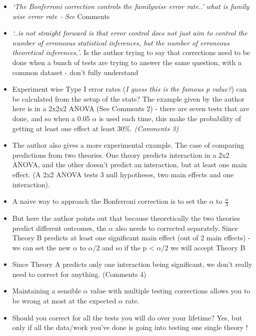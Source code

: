 \documentclass[
]{book}
\begin{document}
\begin{itemize}
\item
  \emph{`The Bonferroni correction controls the familywise error rate..'} \protect\hypertarget{lakens_com}{}{\emph{what is family wise error rate - See} Comments}
\item
  \emph{`..is not straight forward is that error control does not just aim to control the number of erroneous statistical inferences, but the number of erroneous theoretical inferences.'}. Is the author trying to say that corrections need to be done when a bunch of tests are trying to answer the same question, with a common dataset - don't fully understand
\item
  Experiment wise Type I error rates (\emph{I guess this is the famous p value?}) can be calculated from the setup of the stats? The example given by the author here is in a 2x2x2 ANOVA (See \protect\hypertarget{lakens_com}{}{Comments 2}) - there are seven tests that are done, and so when a 0.05 \(\alpha\) is used each time, this make the probability of getting at least one effect at least 30\%. \emph{(\protect\hypertarget{lakens_com}{}{Comments 3})}
\item
  The author also gives a more experimental example. The case of comparing predictions from two theories. One theory predicts interaction in a 2x2 ANOVA, and the other doesn't predict an interaction, but at least one main effect. (A 2x2 ANOVA tests 3 null hypotheses, two main effects and one interaction).\\
\item
  A naive way to approach the Bonferroni correction is to set the \(\alpha\) to \(\frac{\alpha}{3}\)
\item
  But here the author points out that because theoretically the two theories predict different outcomes, the \(\alpha\) also needs to corrected separately. Since Theory B predicts at least one significant main effect (out of 2 main effects) - we can set the new \(\alpha\) to \(\alpha /2\) and so if the p \textless{} \(\alpha/2\) we will accept Theory B
\item
  Since Theory A predicts only one interaction being significant, we don't really need to correct for anything. (\protect\hypertarget{lakens_com}{}{Comments 4})
\item
  Maintaining a sensible \(\alpha\) value with multiple testing corrections allows you to be wrong at most at the expected \(\alpha\) rate.
\item
  Should you correct for all the tests you will do over your lifetime? Yes, but only if all the data/work you've done is going into testing one single theory !

\end{itemize}
\end{document}
